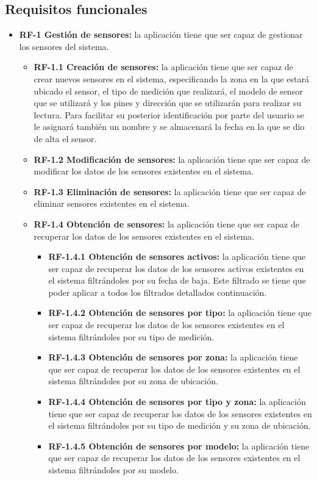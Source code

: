     \subsection{Requisitos funcionales}
    \begin{itemize}
        \item \textbf{RF-1 Gestión de sensores:} la aplicación tiene que ser capaz de gestionar los sensores del sistema.
            \begin{itemize}
                \item \textbf{RF-1.1 Creación de sensores:} la aplicación tiene que ser capaz de crear nuevos sensores en el sistema, especificando la zona en la que estará ubicado el sensor, el tipo de medición que realizará, el modelo de sensor que se utilizará y los pines y dirección que se utilizarán para realizar su lectura. Para facilitar su posterior identificación por parte del usuario se le asignará también un nombre y se almacenará la fecha en la que se dio de alta el sensor.
                \item \textbf{RF-1.2 Modificación de sensores:} la aplicación tiene que ser capaz de modificar los datos de los sensores existentes en el sistema.
                \item \textbf{RF-1.3 Eliminación de sensores:} la aplicación tiene que ser capaz de eliminar sensores existentes en el sistema. 
                \item \textbf{RF-1.4 Obtención de sensores:} la aplicación tiene que ser capaz de recuperar los datos de los sensores existentes en el sistema.
                \begin{itemize}
                    \item \textbf{RF-1.4.1 Obtención de sensores activos:} la aplicación tiene que ser capaz de recuperar los datos de los sensores activos existentes en el sistema filtrándoles por su fecha de baja. Este filtrado se tiene que poder aplicar a todos los filtrados detallados continuación. 
                    \item \textbf{RF-1.4.2 Obtención de sensores por tipo:} la aplicación tiene que ser capaz de recuperar los datos de los sensores existentes en el sistema filtrándoles por su tipo de medición.
                    \item \textbf{RF-1.4.3 Obtención de sensores por zona:} la aplicación tiene que ser capaz de recuperar los datos de los sensores existentes en el sistema filtrándoles por su zona de ubicación.
                    \item \textbf{RF-1.4.4 Obtención de sensores por tipo y zona:} la aplicación tiene que ser capaz de recuperar los datos de los sensores existentes en el sistema filtrándoles por su tipo de medición y su zona de ubicación.
                    \item \textbf{RF-1.4.5 Obtención de sensores por modelo:} la aplicación tiene que ser capaz de recuperar los datos de los sensores existentes en el sistema filtrándoles por su modelo.
                \end{itemize}
            \end{itemize}
            

\end{itemize}
